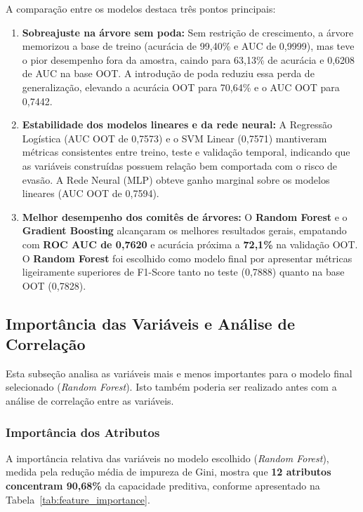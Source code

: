 A comparação entre os modelos destaca três pontos principais:
\begin{enumerate}[leftmargin=*]
    \item \textbf{Sobreajuste na árvore sem poda:} Sem restrição de crescimento, a árvore memorizou a base de treino (acurácia de 99,40\% e AUC de 0,9999), mas teve o pior desempenho fora da amostra, caindo para 63,13\% de acurácia e 0,6208 de AUC na base OOT. A introdução de poda reduziu essa perda de generalização, elevando a acurácia OOT para 70,64\% e o AUC OOT para 0,7442.
    \item \textbf{Estabilidade dos modelos lineares e da rede neural:} A Regressão Logística (AUC OOT de 0,7573) e o SVM Linear (0,7571) mantiveram métricas consistentes entre treino, teste e validação temporal, indicando que as variáveis construídas possuem relação bem comportada com o risco de evasão. A Rede Neural (MLP) obteve ganho marginal sobre os modelos lineares (AUC OOT de 0,7594).
    \item \textbf{Melhor desempenho dos comitês de árvores:} O \textbf{Random Forest} e o \textbf{Gradient Boosting} alcançaram os melhores resultados gerais, empatando com \textbf{ROC AUC de 0,7620} e acurácia próxima a \textbf{72,1\%} na validação OOT. O \textbf{Random Forest} foi escolhido como modelo final por apresentar métricas ligeiramente superiores de F1-Score tanto no teste (0,7888) quanto na base OOT (0,7828).
\end{enumerate}

\subsection{Importância das Variáveis e Análise de Correlação}\label{subsec:importancia_correlacao}

Esta subseção analisa as variáveis mais e menos importantes para o modelo final selecionado (\textit{Random Forest}). 
Isto também poderia ser realizado antes com a análise de correlação entre as variáveis.

\subsubsection{Importância dos Atributos}
A importância relativa das variáveis no modelo escolhido (\textit{Random Forest}), medida pela redução média de impureza de Gini, mostra que \textbf{12 atributos concentram 90,68\%} da capacidade preditiva, conforme apresentado na Tabela~\ref{tab:feature_importance}.

